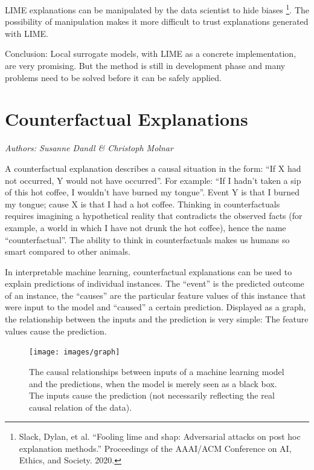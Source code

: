 \documentclass[12pt,]{krantz}
\begin{document}
LIME explanations can be manipulated by the data scientist to hide
biases \footnote{Slack, Dylan, et al. ``Fooling lime and shap:
  Adversarial attacks on post hoc explanation methods.'' Proceedings of
  the AAAI/ACM Conference on AI, Ethics, and Society. 2020.}. The
possibility of manipulation makes it more difficult to trust
explanations generated with LIME.

Conclusion: Local surrogate models, with LIME as a concrete
implementation, are very promising. But the method is still in
development phase and many problems need to be solved before it can be
safely applied.

\newpage

\hypertarget{counterfactual}{\section{Counterfactual
Explanations}\label{counterfactual}}

\emph{Authors: Susanne Dandl \& Christoph Molnar}

A counterfactual explanation describes a causal situation in the form:
``If X had not occurred, Y would not have occurred''. For example: ``If
I hadn't taken a sip of this hot coffee, I wouldn't have burned my
tongue''. Event Y is that I burned my tongue; cause X is that I had a
hot coffee. Thinking in counterfactuals requires imagining a
hypothetical reality that contradicts the observed facts (for example, a
world in which I have not drunk the hot coffee), hence the name
``counterfactual''. The ability to think in counterfactuals makes us
humans so smart compared to other animals.

In interpretable machine learning, counterfactual explanations can be
used to explain predictions of individual instances. The ``event'' is
the predicted outcome of an instance, the ``causes'' are the particular
feature values of this instance that were input to the model and
``caused'' a certain prediction. Displayed as a graph, the relationship
between the inputs and the prediction is very simple: The feature values
cause the prediction.

\begin{figure}

{\centering \texttt{[image: images/graph]} 

}

\caption{The causal relationships between inputs of a machine learning model and the predictions, when the model is merely seen as a black box. The inputs cause the prediction (not necessarily reflecting the real causal relation of the data).}\label{fig:ml-graph-cf}
\end{figure}
\end{document}
